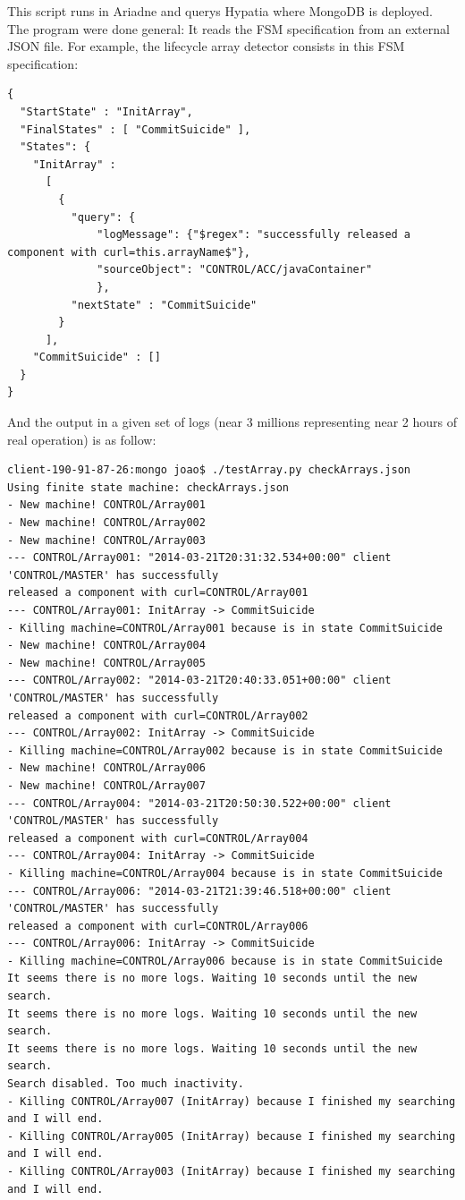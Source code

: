 \documentclass[]{spie}  %
\begin{document}
This script runs in Ariadne and querys Hypatia where MongoDB is deployed. The
program were done general: It reads the FSM specification from an external JSON
file. For example, the lifecycle array detector consists in this FSM
specification:
\begin{verbatim}
{
  "StartState" : "InitArray",
  "FinalStates" : [ "CommitSuicide" ],
  "States": {
    "InitArray" : 
      [
        { 
          "query": {
              "logMessage": {"$regex": "successfully released a component with curl=this.arrayName$"},
              "sourceObject": "CONTROL/ACC/javaContainer"
              },
          "nextState" : "CommitSuicide"
        }
      ],
    "CommitSuicide" : []
  }
}

\end{verbatim}

And the output in a given set of logs (near 3 millions representing near 2 hours of real operation) is as follow:
\begin{verbatim}
client-190-91-87-26:mongo joao$ ./testArray.py checkArrays.json
Using finite state machine: checkArrays.json
- New machine! CONTROL/Array001
- New machine! CONTROL/Array002
- New machine! CONTROL/Array003
--- CONTROL/Array001: "2014-03-21T20:31:32.534+00:00" client 'CONTROL/MASTER' has successfully 
released a component with curl=CONTROL/Array001
--- CONTROL/Array001: InitArray -> CommitSuicide
- Killing machine=CONTROL/Array001 because is in state CommitSuicide
- New machine! CONTROL/Array004
- New machine! CONTROL/Array005
--- CONTROL/Array002: "2014-03-21T20:40:33.051+00:00" client 'CONTROL/MASTER' has successfully 
released a component with curl=CONTROL/Array002
--- CONTROL/Array002: InitArray -> CommitSuicide
- Killing machine=CONTROL/Array002 because is in state CommitSuicide
- New machine! CONTROL/Array006
- New machine! CONTROL/Array007
--- CONTROL/Array004: "2014-03-21T20:50:30.522+00:00" client 'CONTROL/MASTER' has successfully 
released a component with curl=CONTROL/Array004
--- CONTROL/Array004: InitArray -> CommitSuicide
- Killing machine=CONTROL/Array004 because is in state CommitSuicide
--- CONTROL/Array006: "2014-03-21T21:39:46.518+00:00" client 'CONTROL/MASTER' has successfully 
released a component with curl=CONTROL/Array006
--- CONTROL/Array006: InitArray -> CommitSuicide
- Killing machine=CONTROL/Array006 because is in state CommitSuicide
It seems there is no more logs. Waiting 10 seconds until the new search.
It seems there is no more logs. Waiting 10 seconds until the new search.
It seems there is no more logs. Waiting 10 seconds until the new search.
Search disabled. Too much inactivity.
- Killing CONTROL/Array007 (InitArray) because I finished my searching and I will end.
- Killing CONTROL/Array005 (InitArray) because I finished my searching and I will end.
- Killing CONTROL/Array003 (InitArray) because I finished my searching and I will end.
\end{verbatim}
\end{document}
